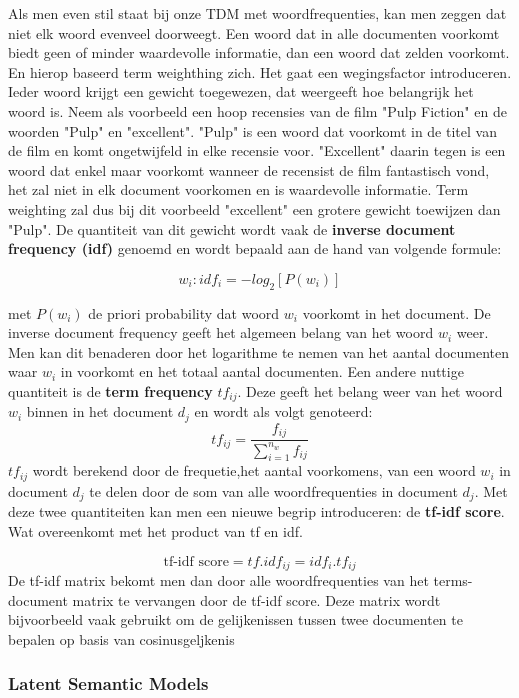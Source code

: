 Als men even stil staat bij onze TDM met woordfrequenties, kan men zeggen dat niet elk woord evenveel doorweegt. Een woord dat in alle documenten voorkomt biedt geen of minder waardevolle informatie, dan een woord dat zelden voorkomt. En hierop baseerd term weighthing zich. Het gaat een wegingsfactor introduceren. Ieder woord krijgt een gewicht toegewezen, dat weergeeft hoe belangrijk het woord is. Neem als voorbeeld een hoop recensies van de film "Pulp Fiction" en de woorden "Pulp" en "excellent". "Pulp" is een woord dat voorkomt in de titel van de film en komt ongetwijfeld in elke recensie voor. "Excellent" daarin tegen is een woord dat enkel maar voorkomt wanneer de recensist de film fantastisch vond, het zal niet in elk document voorkomen en is waardevolle informatie. Term weighting zal dus bij dit voorbeeld "excellent" een grotere gewicht toewijzen dan "Pulp". 
%
De quantiteit van dit gewicht wordt vaak de \textbf{inverse document frequency  (idf)} genoemd en wordt bepaald aan de hand van volgende formule:

\[w_{i}: idf_{i} = -log_{2}[P(w_{i})] \] 

met $P(w_{i})$ de priori probability dat woord $w_{i}$ voorkomt in het document.
%
De inverse document frequency geeft het algemeen belang van het woord $w_{i}$ weer. Men kan dit benaderen door het logarithme te nemen van het aantal documenten waar $w_{i}$ in voorkomt en het totaal aantal documenten.
Een andere nuttige quantiteit is de  \textbf{term frequency} $tf_{ij}$. Deze geeft het belang weer van het woord $w_{i}$ binnen in het document $d_{j}$  en wordt als volgt genoteerd:
\[ tf_{ij} = \frac{f_{ij}}{ \sum_{i=1}^{n_{w}}f_{ij}} \]
%
$tf_{ij}$ wordt berekend door de frequetie,het aantal voorkomens, van een woord $w_{i}$ in document $d_{j}$ te delen door de som van alle woordfrequenties in document $d_{j}$.
Met deze twee quantiteiten kan men een nieuwe begrip introduceren: de \textbf{tf-idf score}. Wat overeenkomt met het product van tf en idf.
 
\[ \text{tf-idf score} = tf . idf_{ij} = idf_{i} . tf_{ij} \]
%
De tf-idf matrix bekomt men dan door alle woordfrequenties van het terms-document matrix te vervangen door de tf-idf score.
Deze matrix wordt bijvoorbeeld vaak gebruikt om de gelijkenissen tussen twee documenten te bepalen op basis van cosinusgeljkenis


\subsubsection{Latent Semantic Models}\label{Latent Semantic Models}

